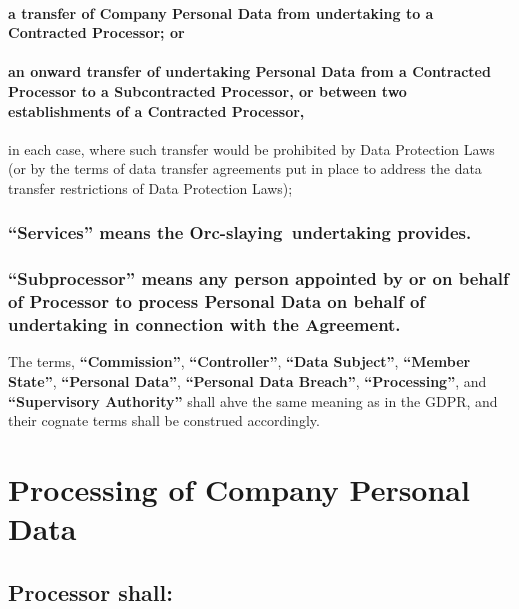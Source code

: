 \documentclass[a4paper]{article}
\newcommand{\services}{Orc-slaying}
\begin{document}
\paragraph{a transfer of Company Personal Data from \gls{undertaking} to a Contracted Processor; or}

\paragraph{an onward transfer of \gls{undertaking} Personal Data from a Contracted Processor to a Subcontracted Processor, or between two establishments of a Contracted Processor,}

\noindent
in each case, where such transfer would be prohibited by Data Protection Laws (or by the terms of data transfer agreements put in place to address the data transfer restrictions of Data Protection Laws);

\subsubsection{\textbf{``Services''} means the \services\ \gls{undertaking} provides.}

\subsubsection{\textbf{``Subprocessor''} means any person appointed by or on behalf of Processor to process Personal Data on behalf of \gls{undertaking} in connection with the Agreement.}

The terms, \textbf{``Commission''}, \textbf{``Controller''}, \textbf{``Data Subject''}, \textbf{``Member State''}, \textbf{``Personal Data''}, \textbf{``Personal Data Breach''}, \textbf{``Processing''}, and \textbf{``Supervisory Authority''} shall ahve the same meaning as in the GDPR, and their cognate terms shall be construed accordingly.

\section{Processing of Company Personal Data}

\subsection{Processor shall:}
\end{document}
